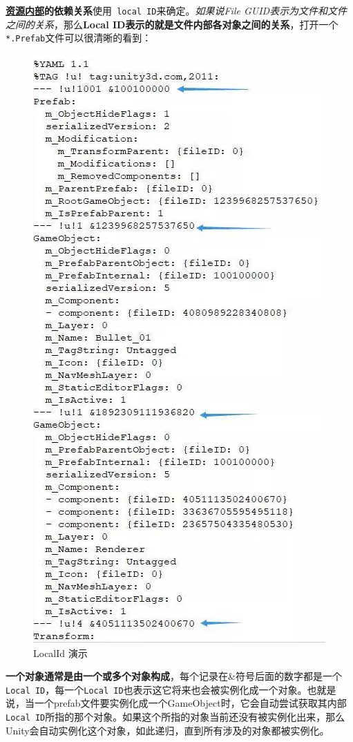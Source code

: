 \documentclass[UTF8,a4paper,12pt]{ctexbook}
\begin{document}
			\textbf{\underline{资源内部}的依赖关系}使用\verb| local ID|来确定。\textit{如果说File GUID表示为文件和文件之间的关系}，那么\textbf{Local ID表示的就是文件内部各对象之间的关系}，打开一个\verb|*.Prefab|文件可以很清晰的看到：
				\begin{figure}[H]
					\centering
					\includegraphics[scale=1.12]{localId}
					\caption{LocalId 演示}
				\end{figure}
		
			\textbf{一个对象通常是由一个或多个对象构成}，每个记录在\&符号后面的数字都是一个\verb|Local ID|，每一个\verb|Local ID|也表示这它将来也会被实例化成一个对象。也就是说，当一个prefab文件要实例化成一个GameObject时，它会自动尝试获取其内部\verb|Local ID|所指的那个对象。如果这个所指的对象当前还没有被实例化出来，那么Unity会自动实例化这个对象，如此递归，直到所有涉及的对象都被实例化。
			
\end{document}
